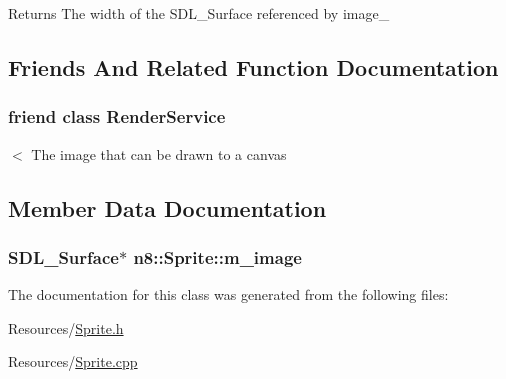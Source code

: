 \begin{DoxyReturn}{Returns}
The width of the S\-D\-L\-\_\-\-Surface referenced by image\-\_\- 
\end{DoxyReturn}


\subsection{Friends And Related Function Documentation}
\hypertarget{classn8_1_1_sprite_aedde775898ebe0d7c84c0060e1c9d770}{
\subsubsection[{Render\-Service}]{\setlength{\rightskip}{0pt plus 5cm}friend class Render\-Service\hspace{0.3cm}{\ttfamily [friend]}}}\label{classn8_1_1_sprite_aedde775898ebe0d7c84c0060e1c9d770}
$<$ The image that can be drawn to a canvas 

\subsection{Member Data Documentation}
\hypertarget{classn8_1_1_sprite_a8bbf98f385191ab5d756784ceac802b1}{
\subsubsection[{m\-\_\-image}]{\setlength{\rightskip}{0pt plus 5cm}S\-D\-L\-\_\-\-Surface$\ast$ n8\-::\-Sprite\-::m\-\_\-image\hspace{0.3cm}{\ttfamily [private]}}}\label{classn8_1_1_sprite_a8bbf98f385191ab5d756784ceac802b1}


The documentation for this class was generated from the following files\-:\begin{DoxyCompactItemize}
\item 
Resources/\hyperlink{_sprite_8h}{Sprite.\-h}\item 
Resources/\hyperlink{_sprite_8cpp}{Sprite.\-cpp}\end{DoxyCompactItemize}
